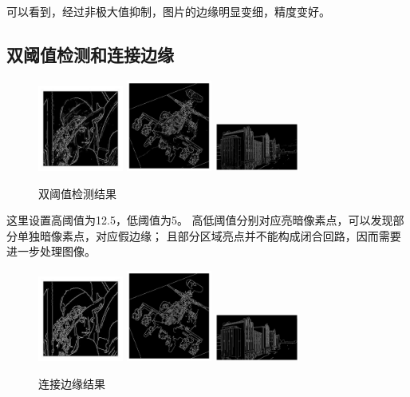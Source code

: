 \documentclass{article}
\begin{document}
    可以看到，经过非极大值抑制，图片的边缘明显变细，精度变好。
    
\subsection{双阈值检测和连接边缘}

\begin{figure}[h]
    \centering
    \includegraphics[width=0.25\textwidth]{./classify_125_5/1}
    \includegraphics[width=0.25\textwidth]{./classify_125_5/2}
    \includegraphics[width=0.25\textwidth]{./classify_125_5/3}
    \caption{双阈值检测结果}
\end{figure}

    这里设置高阈值为12.5，低阈值为5。
    高低阈值分别对应亮暗像素点，可以发现部分单独暗像素点，对应假边缘；
    且部分区域亮点并不能构成闭合回路，因而需要进一步处理图像。

\begin{figure}[h]
    \centering
    \includegraphics[width=0.25\textwidth]{./result/1_125_5}
    \includegraphics[width=0.25\textwidth]{./result/2_125_5}
    \includegraphics[width=0.25\textwidth]{./result/3_125_5}
    \caption{连接边缘结果}
\end{figure}
\end{document}
